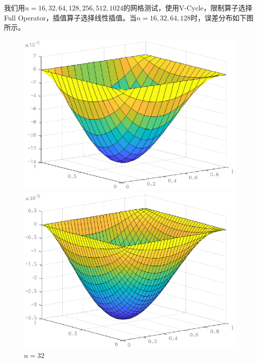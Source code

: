 \documentclass[lang=cn,10pt]{elegantbook}
\begin{document}
我们用$n=16,32,64,128,256,512,1024$的网格测试，使用V-Cycle，限制算子选择Full Operator，插值算子选择线性插值。当$n=16,32,64,128$时，误差分布如下图所示。
\begin{figure}[H]
  \centering
  \begin{minipage}[t]{0.24\linewidth}
      \centering
      \includegraphics[width=0.95\linewidth]{figure/2-1-1.eps}
      \caption*{$n=16$}
  \end{minipage}
  \begin{minipage}[t]{0.24\linewidth}
    \centering
    \includegraphics[width=0.95\linewidth]{figure/2-1-2.eps}
    \caption*{$n=32$}
  \end{minipage}
  \begin{minipage}[t]{0.24\linewidth}
    \centering

\end{minipage}
\end{figure}
\end{document}
